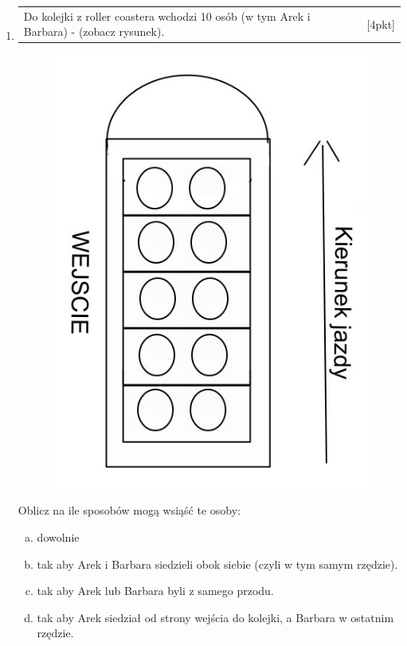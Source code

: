 \documentclass[12pt,a4paper]{article}
\begin{document}
\begin{enumerate}[1.]
		\item  \begin{tabular}{p{13cm} r}
			Do kolejki z roller coastera wchodzi 10 osób (w tym Arek i Barbara) - (zobacz rysunek). &[4pkt]\\ 
		\end{tabular}
		
		\begin{figure}[h]
			\centering
			\includegraphics[scale=0.4]{rpt2.jpeg}
		\end{figure}
		Oblicz na ile sposobów mogą wsiąść te osoby:
		\begin{enumerate}[a)]
			\item dowolnie
			\item tak aby Arek i Barbara siedzieli obok siebie (czyli w tym samym rzędzie).
			\item tak aby Arek lub Barbara byli z samego przodu.
			\item tak aby Arek siedział od strony wejścia do kolejki, a Barbara w ostatnim rzędzie.
		\end{enumerate}
	


\end{enumerate}
\end{document}
